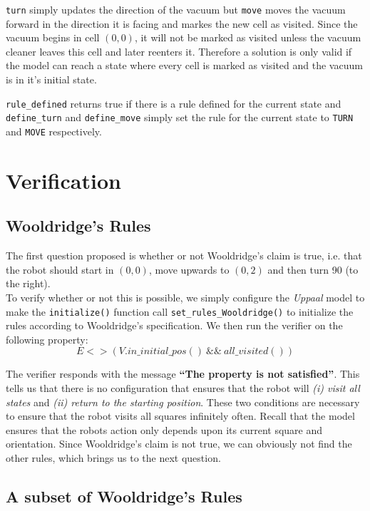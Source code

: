 \documentclass{article}
\begin{document}
    \texttt{turn} simply updates the direction of the vacuum but \texttt{move} moves the vacuum forward in the direction it is facing and markes the new cell as visited. Since the vacuum begins in cell $(0,0)$, it will not be marked as visited unless the vacuum cleaner leaves this cell and later reenters it. Therefore a solution is only valid if the model can reach a state where every cell is marked as visited and the vacuum is in it's initial state.

    \texttt{rule\_defined} returns true if there is a rule defined for the current state and \texttt{define\_turn} and \texttt{define\_move} simply set the rule for the current state to \texttt{TURN} and \texttt{MOVE} respectively.




\section{Verification}

\subsection{Wooldridge's Rules}

The first question proposed is whether or not Wooldridge's claim is true, i.e. that the robot should start in $(0,0)$, move upwards to $(0,2)$ and then turn 90\degree{} (to the right).
\\
To verify whether or not this is possible, we simply configure the \textit{Uppaal} model to make the \texttt{initialize()} function call \texttt{set\_rules\_Wooldridge()} to initialize the rules according to Wooldridge's specification.
We then run the verifier on the following property:
\[ E<>(V.in\_initial\_pos() ~ \&\& ~ all\_visited()) \]

The verifier responds with the message \textbf{``The property is not satisfied''}.
This tells us that there is no configuration that ensures that the robot will \textit{(i) visit all states} and \textit{(ii) return to the starting position}. 
These two conditions are necessary to ensure that the robot visits all squares infinitely often.
Recall that the model ensures that the robots action only depends upon its current square and orientation.
Since Wooldridge's claim is not true, we can obviously not find the other rules, which brings us to the next question.

\subsection{A subset of Wooldridge's Rules}
\end{document}
